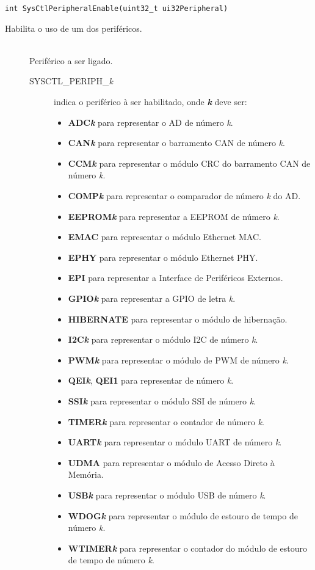 \begin{lstlisting}[style=funcao]
	int SysCtlPeripheralEnable(uint32_t ui32Peripheral)
\end{lstlisting}

Habilita o uso de um dos periféricos.

\begin{description}
	\item []\hfill \\
	Periférico a ser ligado.
	\begin{description}
		\item [SYSCTL\_PERIPH\_\emph{k}] indica o periférico à ser habilitado, onde \textbf{\emph{k}} deve ser:
		\begin{itemize}
			\item \textbf{ADC\emph{k}} para representar o AD de número \emph{k}.
			\item \textbf{CAN\emph{k}} para representar o barramento CAN de número \emph{k}.
			\item \textbf{CCM\emph{k}} para representar o módulo CRC do barramento CAN de número \emph{k}.
			\item \textbf{COMP\emph{k}} para representar o comparador de número \emph{k} do AD.
			\item \textbf{EEPROM\emph{k}} para representar a EEPROM de número \emph{k}.
			\item \textbf{EMAC} para representar o módulo Ethernet MAC.
			\item \textbf{EPHY} para representar o módulo Ethernet PHY.
			\item \textbf{EPI} para representar a Interface de Periféricos Externos.
			\item \textbf{GPIO\emph{k}} para representar a GPIO de letra \emph{k}.
			\item \textbf{HIBERNATE} para representar o módulo de hibernação.
			\item \textbf{I2C\emph{k}} para representar o módulo I2C de número \emph{k}.
			\item \textbf{PWM\emph{k}} para representar o módulo de PWM de número \emph{k}.
			\item \textbf{QEI\emph{k}}, \textbf{QEI1} para representar  de número \emph{k}.
			\item \textbf{SSI\emph{k}} para representar o módulo SSI de número \emph{k}.
			\item \textbf{TIMER\emph{k}} para representar o contador de número \emph{k}.
			\item \textbf{UART\emph{k}} para representar o módulo UART de número \emph{k}.
			\item \textbf{UDMA} para representar o módulo de Acesso Direto à Memória.
			\item \textbf{USB\emph{k}} para representar o módulo USB de número \emph{k}.
			\item \textbf{WDOG\emph{k}} para representar o módulo de estouro de tempo de número \emph{k}.
			\item \textbf{WTIMER\emph{k}} para representar o contador do módulo de estouro de tempo de número \emph{k}.
		\end{itemize}


\end{description}
\end{description}
